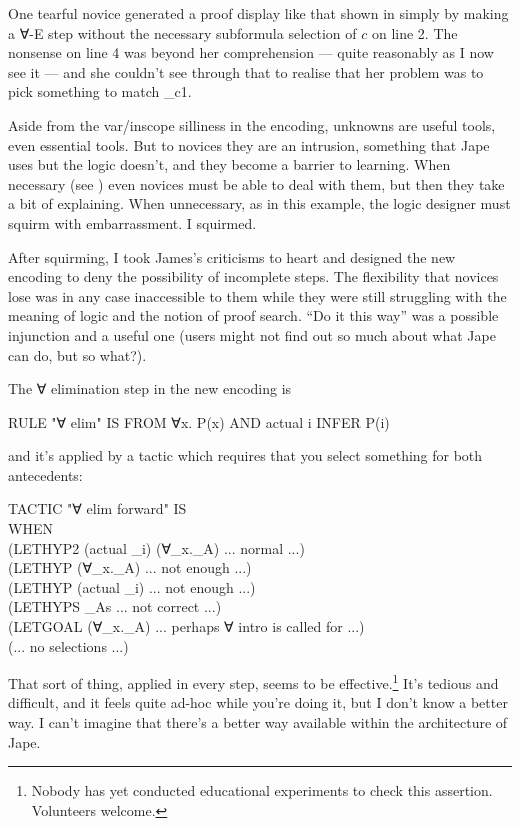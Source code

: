 One tearful novice generated a proof display like that shown in  simply by making a ∀-E step without the necessary subformula selection of $c$ on line 2. The nonsense on line 4 was beyond her comprehension --- quite reasonably as I now see it --- and she couldn't see through that to realise that her problem was to pick something to match \_c1.

Aside from the var/inscope silliness in the  encoding, unknowns are useful tools, even essential tools. But to novices they are an intrusion, something that Jape uses but the logic doesn't, and they become a barrier to learning. When necessary (see ) even novices must be able to deal with them, but then they take a bit of explaining. When unnecessary, as in this example, the logic designer must squirm with embarrassment. I squirmed.

After squirming, I took James's criticisms to heart and designed the new encoding to deny the possibility of incomplete steps. The flexibility that novices lose was in any case inaccessible to them while they were still struggling with the meaning of logic and the notion of proof search. ``Do it this way'' was a possible injunction and a useful one (users might not find out so much about what Jape can do, but so what?). 

The ∀ elimination step in the new encoding is
\begin{japeish}
RULE "∀ elim" IS FROM ∀x. P(x) AND actual i INFER P(i)
\end{japeish}
and it's applied by a tactic which requires that you select something for both antecedents:
\begin{japeish}
TACTIC "∀ elim forward" IS \\
\tab WHEN     \\
\tab \tab (LETHYP2 (actual \_i) (∀\_x.\_A) ... normal ...) \\
\tab \tab (LETHYP (∀\_x.\_A) ... not enough ...) \\
\tab \tab (LETHYP (actual \_i) ... not enough ...) \\
\tab \tab (LETHYPS \_As ... not correct ...) \\
\tab \tab (LETGOAL (∀\_x.\_A) ... perhaps ∀ intro is called for ...) \\
\tab \tab (... no selections ...)
\end{japeish}

That sort of thing, applied in every step, seems to be effective.\footnote{Nobody has yet conducted educational experiments to check this assertion. Volunteers welcome.} It's tedious and difficult, and it feels quite ad-hoc while you're doing it, but I don't know a better way. I can't imagine that there's a better way available within the architecture of Jape.

